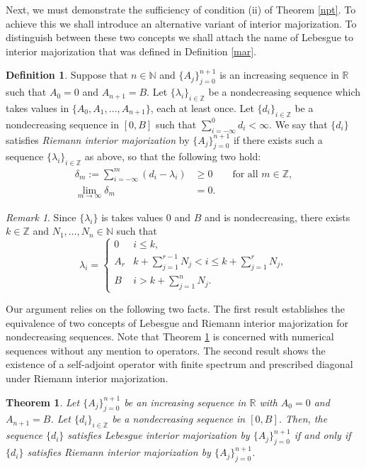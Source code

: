 \documentclass[12pt]{amsart}
\newcounter{Theorem}
\newcounter{Definition}
\numberwithin{equation}{section}
\numberwithin{Theorem}{section}
\theoremstyle{plain}
\newtheorem{thm}[Theorem]{Theorem}
\theoremstyle{definition}
\newtheorem{defn}[Theorem]{Definition}
\theoremstyle{remark}
\newtheorem{remark}{Remark}[section]
\begin{document}
Next, we must demonstrate the sufficiency of condition (ii) of Theorem \ref{npt}. To achieve this we shall introduce an alternative variant of interior majorization. To distinguish between these two concepts we shall attach the name of Lebesgue to interior majorization that was defined in Definition \ref{mar}. 

\begin{defn}\label{rim}
Suppose that $n\in {\mathbb{N}}$ and $\{A_{j}\}_{j=0}^{n+1}$ is an increasing sequence in ${\mathbb{R}}$ such that $A_0=0$ and $A_{n+1}=B$. 
Let $\{\lambda_{i}\}_{i\in{\mathbb{Z}}}$ be a nondecreasing sequence  which takes values in $\{A_{0},A_{1},\ldots,A_{n+1}\}$, each at least once. Let $\{d_{i}\}_{i\in{\mathbb{Z}}}$ be a nondecreasing sequence in $[0,B]$ such that $\sum_{i=-\infty}^0 d_i <\infty$.
We say that $\{d_i\}$ satisfies {\it Riemann interior majorization} by $\{A_j\}_{j=0}^{n+1}$ if there exists such a sequence $\{\lambda_{i}\}_{i\in{\mathbb{Z}}}$ as above, so that the following two hold:
\begin{align}
\label{rmaj1}\delta_{m}:=\sum_{i=-\infty}^{m}(d_{i}-\lambda_{i}) &\geq  0\qquad \text{for all }m\in{\mathbb{Z}},
\\
\label{rmaj2}\lim_{m\to\infty}\delta_{m} & = 0.
\end{align}
\end{defn}

\begin{remark} 
 Since $\{\lambda_{i}\}$ is takes values $0$ and $B$ and is nondecreasing, there exists $k\in{\mathbb{Z}}$ and $N_1,\ldots,N_n\in {\mathbb{N}}$ such that 
\[
\lambda_{i}=\begin{cases}
0& i \le k, \\
A_r & k+ \sum_{j=1}^{r-1} N_j < i \le k+\sum_{j=1}^r N_j, \\
B & i > k+ \sum_{j=1}^n N_j.
\end{cases}
\]
\end{remark}

Our argument relies on the following two facts. The first result \cite[Theorem 5.2]{mbjj3} establishes the equivalence of two concepts of Lebesgue and Riemann interior majorization for nondecreasing sequences. Note that Theorem \ref{eqmajs} is concerned with numerical sequences without any mention to operators. The second result \cite[Theorem 5.3]{mbjj3} shows the existence of a self-adjoint operator with finite spectrum and prescribed diagonal under Riemann interior majorization.

\begin{thm}\label{eqmajs} Let $\{A_j\}_{j=0}^{n+1}$ be an increasing sequence in ${\mathbb{R}}$ with $A_{0}=0$ and $A_{n+1}=B$. Let $\{d_{i}\}_{i\in{\mathbb{Z}}}$ be a nondecreasing sequence in $[0,B]$.
Then, the sequence $\{d_{i}\}$ satisfies Lebesgue interior majorization by $\{A_j\}_{j=0}^{n+1}$ if and only if $\{d_{i}\}$ satisfies Riemann interior majorization by $\{A_j\}_{j=0}^{n+1}$.
\end{thm}
\end{document}
